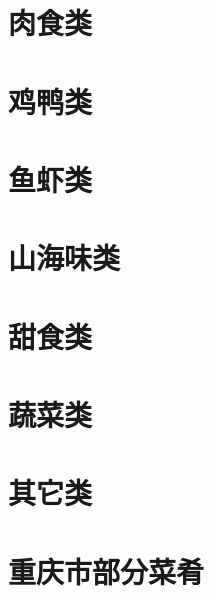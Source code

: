 \documentclass{cookbook}
\begin{document}
\begin{CJK*}{UTF8}{gbsn}
\begin{cookbook}

\section{肉食类}

\section{鸡鸭类}
\section{鱼虾类}
\section{山海味类}
\section{甜食类}
\section{蔬菜类}
\section{其它类}
\section{重庆市部分菜肴}

\end{cookbook}
\end{CJK*}
\end{document}

